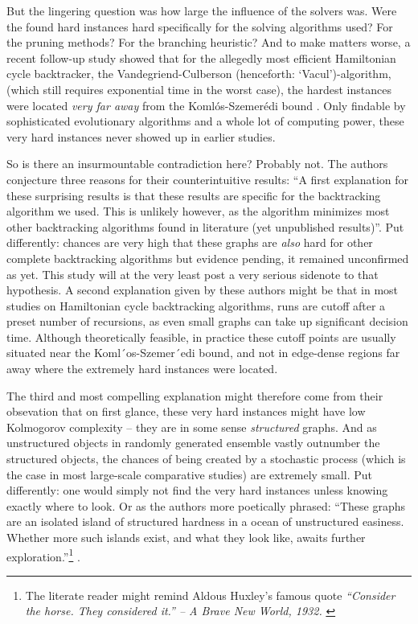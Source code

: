 \documentclass[10pt,conference,compsocconf]{IEEEtran}
\begin{document}
But the lingering question was how large the influence of the solvers was. Were the found hard instances hard specifically for the solving algorithms used? For the pruning methods? For the branching heuristic? And to make matters worse, a recent follow-up study showed that for the allegedly most efficient Hamiltonian cycle backtracker, the Vandegriend-Culberson (henceforth: `Vacul')-algorithm, (which still requires exponential time in the worst case), the hardest instances were located \textit{very  far away} from the Koml\'os-Szemer\'edi bound \cite{sleegers2020plant}\cite{Sleegers2020Looking}. Only findable by sophisticated evolutionary algorithms and a whole lot of computing power, these very hard instances never showed up in earlier studies.


So is there an insurmountable contradiction here? Probably not. The authors conjecture three reasons for their counterintuitive results: ``A first explanation for these surprising results is that these results are specific for the backtracking algorithm we used. This is unlikely however, as the algorithm minimizes most other backtracking algorithms found in literature (yet unpublished results)''. Put differently: chances are very high that these graphs are \textit{also} hard for other complete backtracking algorithms but evidence pending, it remained unconfirmed as yet. This study will at the very least post a very serious sidenote to that hypothesis. A second explanation given by these authors might be that in most studies on Hamiltonian cycle backtracking algorithms, runs are cutoff after a preset number of recursions, as even small graphs can take up significant decision time. Although theoretically feasible, in practice these cutoff points are usually situated near the Koml´os-Szemer´edi bound, and not in edge-dense regions far away where the extremely hard instances were located.



The third and most compelling explanation might therefore come from their obsevation that on first glance, these very hard instances might have low Kolmogorov complexity – they are in some sense \textit{structured} graphs. And as unstructured objects in randomly generated ensemble vastly outnumber the structured objects, the chances of being created by a stochastic process (which is the case in most large-scale comparative studies) are extremely small. Put differently: one would simply not find the very hard instances unless knowing exactly where to look. Or as the authors more poetically phrased: ``These graphs are an isolated island of structured hardness in a ocean of unstructured easiness. Whether more such islands exist, and what they look like, awaits further exploration.''\footnote{The literate reader might remind Aldous Huxley's famous quote \textit{``Consider the horse. They considered it.'' -- A Brave New World, 1932.} \cite{huxley2007brave}}   \cite{sleegers2020plant}.
\end{document}
